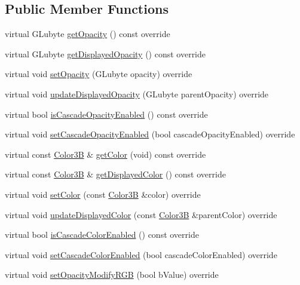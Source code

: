 \subsection*{Public Member Functions}
\begin{DoxyCompactItemize}
\item 
virtual G\+Lubyte \hyperlink{class____NodeRGBA_a48a5a78aea7c307ccfbe8c10e053b7c8}{get\+Opacity} () const override
\item 
virtual G\+Lubyte \hyperlink{class____NodeRGBA_adbf1aa17734836db2096f2901d81d304}{get\+Displayed\+Opacity} () const override
\item 
virtual void \hyperlink{class____NodeRGBA_aa0ac4f9dca25f519f175e668ba4f3306}{set\+Opacity} (G\+Lubyte opacity) override
\item 
virtual void \hyperlink{class____NodeRGBA_a428c41148bb3d1fe27d7eac80bb6df59}{update\+Displayed\+Opacity} (G\+Lubyte parent\+Opacity) override
\item 
virtual bool \hyperlink{class____NodeRGBA_a421ef9c26c9860deb23184727d573415}{is\+Cascade\+Opacity\+Enabled} () const override
\item 
virtual void \hyperlink{class____NodeRGBA_a10fe85e705700fbe2bd28da1a17eda68}{set\+Cascade\+Opacity\+Enabled} (bool cascade\+Opacity\+Enabled) override
\item 
virtual const \hyperlink{structColor3B}{Color3B} \& \hyperlink{class____NodeRGBA_a730149ff787a7a86d78a5c0d0aecddda}{get\+Color} (void) const override
\item 
virtual const \hyperlink{structColor3B}{Color3B} \& \hyperlink{class____NodeRGBA_ae17a9077b86673cb75f799cb4f6c8a1d}{get\+Displayed\+Color} () const override
\item 
virtual void \hyperlink{class____NodeRGBA_adaec184f0ee740557ffddaece7ece996}{set\+Color} (const \hyperlink{structColor3B}{Color3B} \&color) override
\item 
virtual void \hyperlink{class____NodeRGBA_a7b792b469020beebcd515a2eacba90f7}{update\+Displayed\+Color} (const \hyperlink{structColor3B}{Color3B} \&parent\+Color) override
\item 
virtual bool \hyperlink{class____NodeRGBA_a24f2ae00f1994d6601ce8e1f089dafe1}{is\+Cascade\+Color\+Enabled} () const override
\item 
virtual void \hyperlink{class____NodeRGBA_a07c6d23e55cc2ba21115d2b93ef25bcd}{set\+Cascade\+Color\+Enabled} (bool cascade\+Color\+Enabled) override
\item 
virtual void \hyperlink{class____NodeRGBA_a2baa7449894e58c0bc78e749058b9c0e}{set\+Opacity\+Modify\+R\+GB} (bool b\+Value) override

\end{DoxyCompactItemize}
